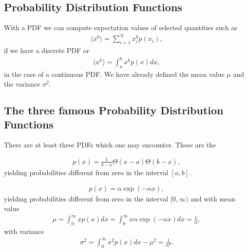 \documentclass[letterpaper,10pt,english]{sphinxmanual}
\begin{document}
\subsection{Probability Distribution Functions}
\label{\detokenize{chapter3:id1}}
With a PDF we can compute expectation values of selected quantities such as
\begin{equation*}
\begin{split}
\langle x^k\rangle=\sum_{i=1}^{N}x_i^kp(x_i),
\end{split}
\end{equation*}
if we have a discrete PDF or
\begin{equation*}
\begin{split}
\langle x^k\rangle=\int_a^b x^kp(x)dx,
\end{split}
\end{equation*}
in the case of a continuous PDF. We have already defined the mean value \(\mu\)
and the variance \(\sigma^2\).


\subsection{The three famous Probability Distribution Functions}
\label{\detokenize{chapter3:the-three-famous-probability-distribution-functions}}
There are at least three PDFs which one may encounter. These are the

\begin{equation*}
\begin{split}
p(x)=\frac{1}{b-a}\Theta(x-a)\Theta(b-x),
\end{split}
\end{equation*}
yielding probabilities different from zero in the interval \([a,b]\).

\begin{equation*}
\begin{split}
p(x)=\alpha \exp{(-\alpha x)},
\end{split}
\end{equation*}
yielding probabilities different from zero in the interval \([0,\infty)\) and with mean value
\begin{equation*}
\begin{split}
\mu = \int_0^{\infty}xp(x)dx=\int_0^{\infty}x\alpha \exp{(-\alpha x)}dx=\frac{1}{\alpha},
\end{split}
\end{equation*}
with variance
\begin{equation*}
\begin{split}
\sigma^2=\int_0^{\infty}x^2p(x)dx-\mu^2 = \frac{1}{\alpha^2}.
\end{split}
\end{equation*}
\end{document}
